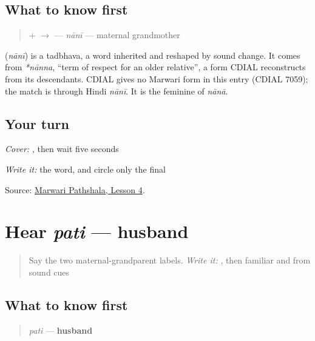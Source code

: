 \subsection*{What to know first}
\begin{quote}
\textbf{} + \textbf{} $\to$ \textbf{} — \emph{nānī} — maternal grandmother
\end{quote}

\begin{cousinweb}
\textbf{} (\emph{nānī}) is a tadbhava, a word inherited and reshaped by sound change. It comes from \emph{*nānna}, \textquotedblleft{}term of respect for an older relative\textquotedblright{}, a form CDIAL reconstructs from its descendants. CDIAL gives no Marwari form in this entry (CDIAL 7059); the match is through Hindi \emph{nānī}. It is the feminine of \emph{nānā}.
\end{cousinweb}

\subsection*{Your turn}
\emph{Cover:} \textbf{}, then wait five seconds

\emph{Write it:} the word, and circle only the final \textbf{}

\begin{tcolorbox}[breakable,colback=teal!4,colframe=teal!35!black,title={Before you move on}]
Source: \href{https://www.marwaripathshala.com/marwari-lesson-4-english}{Marwari Pathshala, Lesson 4}.
\end{tcolorbox}
\section[pati]{Hear \emph{pati} — husband}

\label{lesson:MW-C09-hear-pati}



\begin{quote}
Say the two maternal-grandparent labels. \emph{Write it:} \textbf{}, then familiar \textbf{} and \textbf{} from sound cues
\end{quote}

\subsection*{What to know first}
\begin{quote}
\emph{pati} — \textbf{husband}
\end{quote}

